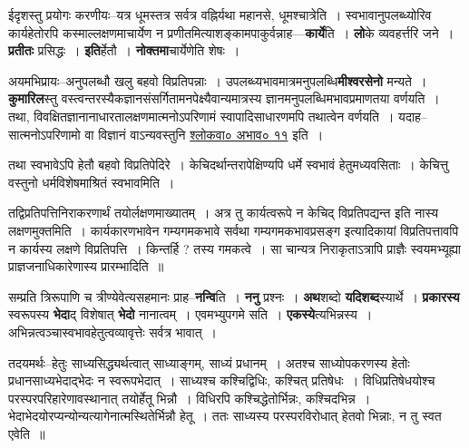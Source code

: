 \documentclass[article,12pt,a4paper]{memoir}
\begin{document}
	  \pstart ईदृशस्तु प्रयोगः करणीयः--यत्र धूमस्तत्र सर्वत्र वह्निर्यथा महानसे, धूमश्चात्रेति । स्वभावानुपलब्ध्योरिव कार्यहेतोरपि कस्माल्लक्षणमाचार्येण न प्रणीतमित्याशङ्कामपाकुर्वन्नाह—\textbf{कार्ये}ति । \textbf{लो}के व्यवहर्त्तरि जने । \textbf{प्रतीतः} प्रसिद्धः । \textbf{इति}र्हेतौ । \textbf{नोक्तमा}चार्येणेति शेषः ।
	\pend
      

	  \pstart अयमभिप्रायः--अनुपलब्धौ खलु बहवो विप्रतिपन्नाः । उपलब्ध्यभावमात्रमनुपलब्धि\textbf{मीश्वरसेनो} मन्यते । \textbf{कुमारिल}स्तु वस्त्वन्तरस्यैकज्ञानसंसर्गितामनपेक्ष्यैवान्यमात्रस्य ज्ञानमनुपलब्धिमभावप्रमाणतया वर्णयति । तथा, विवक्षितज्ञानानाधारतालक्षणमात्मनोऽपरिणामं स्वापादिसाधारणम\leavevmode{}पि तथात्वेन वर्णयति । यदाह--सात्मनोऽपरिणामो वा विज्ञानं वाऽन्यवस्तुनि \href{http://sarit.indology.info/?cref=śv.abhāva.11}{श्लोकवा० अभाव० ११} इति ।
	\pend
      

	  \pstart तथा स्वभावेऽपि हेतौ बहवो विप्रतिपेदिरे । केचिदर्थान्तरापेक्षिण्यपि धर्मे स्वभावं हेतुमध्यवसिताः । केचित्तु वस्तुनो धर्मविशेषमाश्रितं स्वभावमिति ।
	\pend
      

	  \pstart तद्विप्रतिपत्तिनिराकरणार्थं तयोर्लक्षणमाख्यातम् । अत्र तु कार्यत्वरूपे न केचिद् विप्रतिपद्यन्त इति नास्य लक्षणमुक्तमिति । कार्यकारणभावेन गम्यगमकभावे सर्वथा गम्यगमकभावप्रसङ्ग इत्यादिकायां विप्रतिपत्तावपि न कार्यस्य लक्षणे विप्रतिपत्ति । किन्तर्हि ? तस्य गमकत्वे । सा चान्यत्र निराकृताऽत्रापि प्राज्ञैः स्वयमभ्यूह्या प्राज्ञजनाधिकारेणास्य प्रारम्भादिति ॥
	\pend
      

	  \pstart सम्प्रति त्रिरूपाणि च त्रीण्येवेत्यसहमानः प्राह--\textbf{नन्वि}ति । \textbf{ननु} प्रश्नः । \textbf{अथ}शब्दो \textbf{यदिशब्द}स्यार्थे । \textbf{प्रकारस्य} स्वरूपस्य \textbf{भेदा}द् विशेषात् \textbf{भेदो} नानात्वम् । एवमभ्युपगमे सति । \textbf{एकस्ये}त्यभिन्नस्य । अभिन्नत्वञ्चास्वभावहेतुत्वव्यावृत्तेः सर्वत्र भावात् ।
	\pend
	  \bigskip
	  \begingroup
	

	  \pstart तदयमर्थः--हेतुः साध्यसिद्ध्यर्थत्वात् साध्याङ्गम्, साध्यं प्रधानम् । अतश्च साध्योपकरणस्य हेतोः प्रधानसाध्यभेदाद्भेदः न स्वरूपभेदात् । साध्यश्च कश्चिद्विधिः, कश्चित् प्रतिषेधः । विधिप्रतिषेधयोश्च परस्परपरिहारेणावस्थानात् तयोर्हेतू भिन्नौ । विधिरपि कश्चिद्धेतोर्भिन्नः, कश्चिदभिन्न । भेदाभेदयोरप्यन्योन्यत्यागेनात्मस्थितेर्भिन्नौ हेतू । ततः साध्यस्य परस्परविरोधात् हेतवो भिन्नाः, न तु स्वत एवेति ॥
	\pend
        
\end{document}
